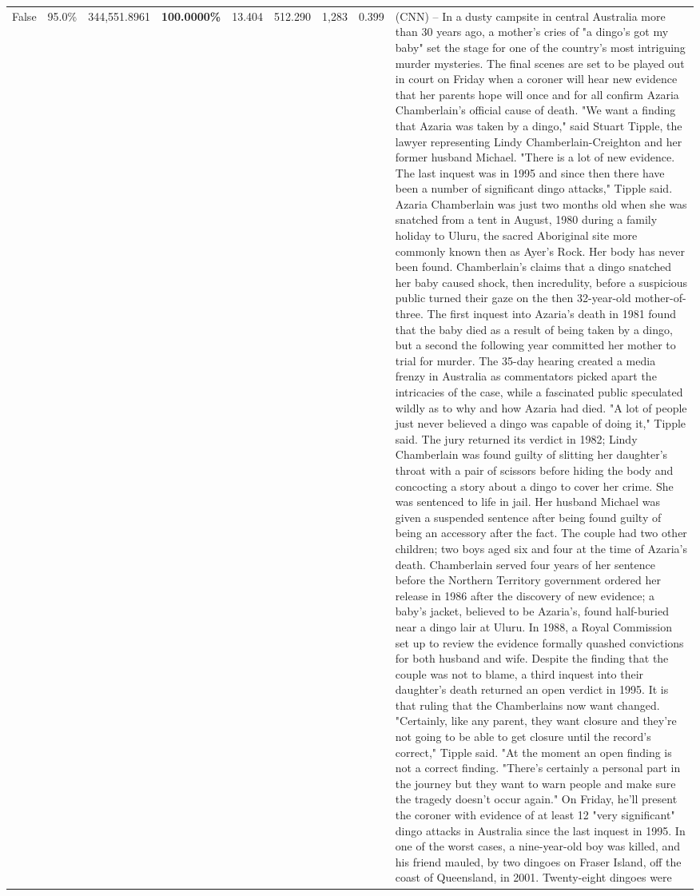 \begin{table}[H]
\begin{tabular}{lllrlllll}
False & 95.0\% & 344,551.8961 & \bfseries \color{red} 100.0000\% & 13.404 & 512.290 & 1,283 & 0.399 & (CNN) -- In a dusty campsite in central Australia more than 30 years ago, a mother's cries of "a dingo's got my baby" set the stage for one of the country's most intriguing murder mysteries. The final scenes are set to be played out in court on Friday when a coroner will hear new evidence that her parents hope will once and for all confirm Azaria Chamberlain's official cause of death. "We want a finding that Azaria was taken by a dingo," said Stuart Tipple, the lawyer representing Lindy Chamberlain-Creighton and her former husband Michael. "There is a lot of new evidence. The last inquest was in 1995 and since then there have been a number of significant dingo attacks," Tipple said. Azaria Chamberlain was just two months old when she was snatched from a tent in August, 1980 during a family holiday to Uluru, the sacred Aboriginal site more commonly known then as Ayer's Rock. Her body has never been found. Chamberlain's claims that a dingo snatched her baby caused shock, then incredulity, before a suspicious public turned their gaze on the then 32-year-old mother-of-three. The first inquest into Azaria's death in 1981 found that the baby died as a result of being taken by a dingo, but a second the following year committed her mother to trial for murder. The 35-day hearing created a media frenzy in Australia as commentators picked apart the intricacies of the case, while a fascinated public speculated wildly as to why and how Azaria had died. "A lot of people just never believed a dingo was capable of doing it," Tipple said. The jury returned its verdict in 1982; Lindy Chamberlain was found guilty of slitting her daughter's throat with a pair of scissors before hiding the body and concocting a story about a dingo to cover her crime. She was sentenced to life in jail. Her husband Michael was given a suspended sentence after being found guilty of being an accessory after the fact. The couple had two other children; two boys aged six and four at the time of Azaria's death. Chamberlain served four years of her sentence before the Northern Territory government ordered her release in 1986 after the discovery of new evidence; a baby's jacket, believed to be Azaria's, found half-buried near a dingo lair at Uluru. In 1988, a Royal Commission set up to review the evidence formally quashed convictions for both husband and wife. Despite the finding that the couple was not to blame, a third inquest into their daughter's death returned an open verdict in 1995. It is that ruling that the Chamberlains now want changed. "Certainly, like any parent, they want closure and they're not going to be able to get closure until the record's correct," Tipple said. "At the moment an open finding is not a correct finding. "There's certainly a personal part in the journey but they want to warn people and make sure the tragedy doesn't occur again." On Friday, he'll present the coroner with evidence of at least 12 "very significant" dingo attacks in Australia since the last inquest in 1995. In one of the worst cases, a nine-year-old boy was killed, and his friend mauled, by two dingoes on Fraser Island, off the coast of Queensland, in 2001. Twenty-eight dingoes were 
\end{tabular}
\end{table}

